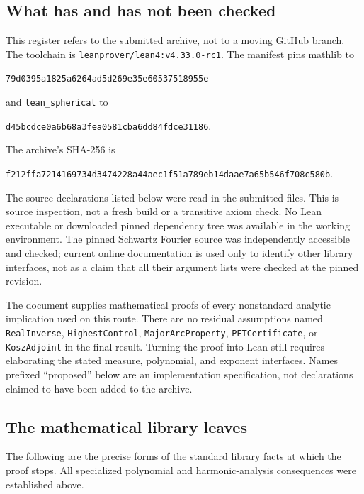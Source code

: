 \documentclass[11pt]{article}
\theoremstyle{definition}
\newcommand{\pid}[1]{\nolinkurl{#1}}
\begin{document}
\subsection{What has and has not been checked}
This register refers to the submitted archive, not to a moving GitHub branch.
The toolchain is \pid{leanprover/lean4:v4.33.0-rc1}. The manifest pins mathlib to
\par{\small\texttt{79d0395a1825a6264ad5d269e35e60537518955e}}\par
and \pid{lean_spherical} to
\par{\small\texttt{d45bcdce0a6b68a3fea0581cba6dd84fdce31186}}.\par
The archive's SHA-256 is
\par{\small\texttt{f212ffa7214169734d3474228a44aec1f51a789eb14daae7a65b546f708c580b}}.\par

The source declarations listed below were read in the submitted files. This is source
inspection, not a fresh build or a transitive axiom check. No Lean executable or downloaded
pinned dependency tree was available in the working environment. The pinned Schwartz
Fourier source was independently accessible and checked; current online documentation is
used only to identify other library interfaces, not as a claim that all their argument lists
were checked at the pinned revision.

The document supplies mathematical proofs of every nonstandard analytic implication used
on this route. There are no residual assumptions named \pid{RealInverse},
\pid{HighestControl}, \pid{MajorArcProperty}, \pid{PETCertificate}, or \pid{KoszAdjoint}
in the final result. Turning the proof into Lean still requires elaborating the stated
measure, polynomial, and exponent interfaces. Names prefixed ``proposed'' below are an
implementation specification, not declarations claimed to have been added to the archive.

\subsection{The mathematical library leaves}
The following are the precise forms of the standard library facts at which the proof stops.
All specialized polynomial and harmonic-analysis consequences were established above.
\end{document}
